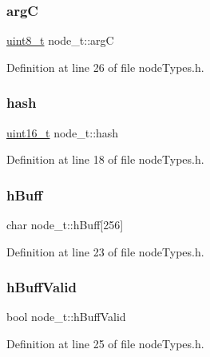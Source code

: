 \subsubsection{\texorpdfstring{argC}{argC}}
{\footnotesize\ttfamily \hyperlink{stdint_8h_aba7bc1797add20fe3efdf37ced1182c5}{uint8\+\_\+t} node\+\_\+t\+::argC}



Definition at line 26 of file node\+Types.\+h.

\mbox{\label{structnode__t_a207289d424c5717a4b11f513753bb94b}} 
\subsubsection{\texorpdfstring{hash}{hash}}
{\footnotesize\ttfamily \hyperlink{stdint_8h_a273cf69d639a59973b6019625df33e30}{uint16\+\_\+t} node\+\_\+t\+::hash}



Definition at line 18 of file node\+Types.\+h.

\mbox{\label{structnode__t_a998c2bd496c99f79b9398468d28bdeb3}} 
\subsubsection{\texorpdfstring{h\+Buff}{hBuff}}
{\footnotesize\ttfamily char node\+\_\+t\+::h\+Buff\mbox{[}256\mbox{]}}



Definition at line 23 of file node\+Types.\+h.

\mbox{\label{structnode__t_a3dd3d6eb01fa69f4cdaf48c32b83e2f5}} 
\subsubsection{\texorpdfstring{h\+Buff\+Valid}{hBuffValid}}
{\footnotesize\ttfamily bool node\+\_\+t\+::h\+Buff\+Valid}



Definition at line 25 of file node\+Types.\+h.

\mbox{\label{structnode__t_a41f66bb03ed3b89dd36173da30ee576a}} 
